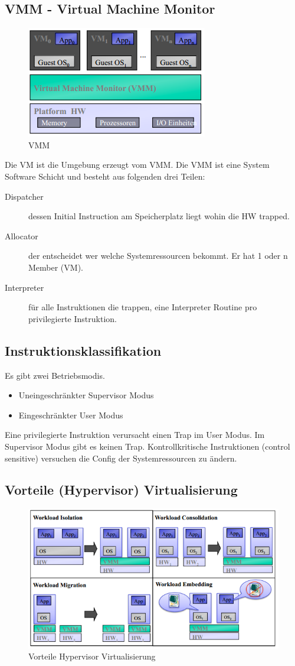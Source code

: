 \subsection{VMM - Virtual Machine Monitor}
\label{sec:vmm-virtual-machine-monitor}
\begin{figure}[h!]
	\centering
	\includegraphics[width=0.4\linewidth]{fig/vmm}
	\caption{VMM}
	\label{fig:vmm}
\end{figure}
Die VM ist die Umgebung erzeugt vom VMM. Die VMM ist eine System Software Schicht und besteht aus folgenden drei Teilen:
\begin{description}
	\item[Dispatcher] dessen Initial Instruction am Speicherplatz liegt wohin die HW trapped.
	\item[Allocator] der entscheidet wer welche Systemressourcen bekommt. Er hat 1 oder n Member (VM).
	\item[Interpreter] für alle Instruktionen die trappen, eine Interpreter Routine pro privilegierte Instruktion.
\end{description}

\subsection{Instruktionsklassifikation}
Es gibt zwei Betriebsmodis.
\begin{itemize}
	\item Uneingeschränkter Supervisor Modus
	\item Eingeschränkter User Modus
\end{itemize}
Eine privilegierte Instruktion verursacht einen Trap im User Modus. Im Supervisor Modus gibt es keinen Trap. Kontrollkritische Instruktionen (control sensitive) versuchen die Config der Systemressourcen zu ändern.

\subsection{Vorteile (Hypervisor) Virtualisierung}
\begin{figure}[h!]
\centering
\includegraphics[width=0.7\linewidth]{fig/vorteile-hypervisor-virtualisierung}
\caption{Vorteile Hypervisor Virtualisierung}
\label{fig:vorteile-hypervisor-virtualisierung}
\end{figure}

